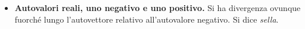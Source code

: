 \begin{itemize}
\begin{figure}[htpb]
\begin{tikzpicture}[x=0.75pt,y=0.75pt,yscale=-1,xscale=1]
	      		
	      	\end{tikzpicture}
	      \end{figure}\FloatBarrier
	      
	\item \textbf{Autovalori reali, uno negativo e uno positivo.} Si ha divergenza ovunque fuorché lungo l'autovettore relativo all'autovalore negativo. Si dice \textit{sella}.
	      
	      \begin{figure}[htpb]\centering
	      	
	      	\begin{tikzpicture}[x=0.75pt,y=0.75pt,yscale=-1,xscale=1]
	      		

\end{tikzpicture}
\end{figure}
\end{itemize}
